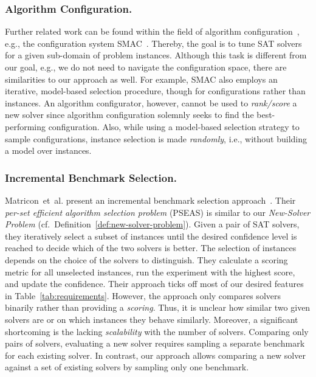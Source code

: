 \documentclass[runningheads]{llncs}
\begin{document}
\subsubsection{Algorithm Configuration.}

Further related work can be found within the field of algorithm configuration~\cite{HoosHL21,Stutzle0P22}, e.g., the configuration system SMAC~\cite{HutterHL11}.
Thereby, the goal is to tune SAT solvers for a given sub-domain of problem instances.
Although this task is different from our goal, e.g., we do not need to navigate the configuration space, there are similarities to our approach as well.
For example, SMAC also employs an iterative, model-based selection procedure, though for configurations rather than instances.
An algorithm configurator, however, cannot be used to \emph{rank/score} a new solver since algorithm configuration solemnly seeks to find the best-performing configuration.
Also, while using a model-based selection strategy to sample configurations, instance selection is made \emph{randomly}, i.e., without building a model over instances.

\subsubsection{Incremental Benchmark Selection.}

Matricon~et~al. present an incremental benchmark selection approach~\cite{MatriconAFSH21}.
Their \emph{per-set efficient algorithm selection problem} (PSEAS) is similar to our \emph{New-Solver Problem} (cf.~Definition~\ref{def:new-solver-problem}).
Given a pair of SAT solvers, they iteratively select a subset of instances until the desired confidence level is reached to decide which of the two solvers is better.
The selection of instances depends on the choice of the solvers to distinguish.
They calculate a scoring metric for all unselected instances, run the experiment with the highest score, and update the confidence.
Their approach ticks off most of our desired features in Table~\ref{tab:requirements}.
However, the approach only compares solvers binarily rather than providing a \emph{scoring}.
Thus, it is unclear how similar two given solvers are or on which instances they behave similarly.
Moreover, a significant shortcoming is the lacking \emph{scalability} with the number of solvers.
Comparing only pairs of solvers, evaluating a new solver requires sampling a separate benchmark for each existing solver.
In contrast, our approach allows comparing a new solver against a set of existing solvers by sampling only one benchmark.
\end{document}
